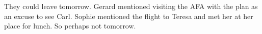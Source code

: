 

They could leave tomorrow.  Gerard mentioned visiting the AFA with the
plan as an excuse to see Carl.  Sophie mentioned the flight to Teresa
and met her at her place for lunch.  So perhaps not tomorrow.

\bye
